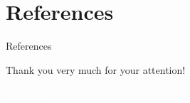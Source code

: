 \documentclass[aspectratio=169, 12pt]{beamer}    %
\begin{document}
\section*{References}

\begin{frame}{References}

\end{frame}

\begin{sectionframe}

\begin{center}
{\Huge
\alert{
Thank you very much for your attention!
}
}
\end{center}
\end{sectionframe}


\begin{titleframe}
\begin{center}
{
\huge

\vspace{1cm}

\textcolor{white}{
The end
}
\vspace{1cm}

}
\end{center}
\end{titleframe}

\begin{titleframe}
\end{titleframe}
\end{document}

